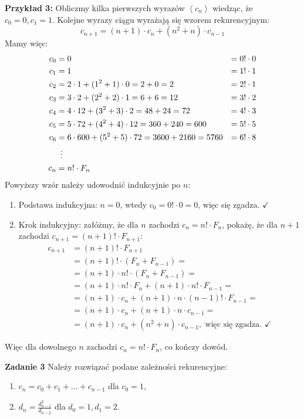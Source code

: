 \documentclass[a4paper,12pt]{article}
\newcommand{\sequence}[1]{\left\langle #1 \right\rangle} %
\begin{document}
\noindent \newline \textbf{Przykład 3:} Obliczmy kilka pierwszych wyrazów $\sequence{c_n}$ wiedząc, że $c_0 = 0, c_1 = 1$. Kolejne wyrazy ciągu wyrażają się wzorem rekurencyjnym: 
\[ c_{n+1} = (n+1) \cdot c_n + (n^2 + n) \cdot c_{n-1} \]
Mamy więc:
\begin{align*}
	c_0 &= 0 													&= 0! \cdot 0 \\
	c_1 &= 1 													&= 1! \cdot 1 \\
	c_2 &= 2\cdot 1 + (1^2 + 1) \cdot 0 = 2 + 0 = 2 			&= 2! \cdot 1 \\
	c_3 &= 3\cdot 2 + (2^2 + 2) \cdot 1 = 6 + 6 = 12 			&= 3! \cdot 2 \\
	c_4 &= 4\cdot 12 + (3^2 + 3) \cdot 2 = 48 + 24 = 72			&= 4! \cdot 3 \\
	c_5 &= 5\cdot 72 + (4^2 + 4) \cdot 12 = 360 + 240 = 600		&= 5! \cdot 5 \\
	c_6 &= 6\cdot 600 + (5^2 + 5) \cdot 72 = 3600 + 2160 = 5760 &= 6! \cdot 8 \\
		&\enskip \vdots \\
	c_n &= n! \cdot F_n
\end{align*}
Powyższy wzór należy udowodnić indukcyjnie po $n$:
\begin{enumerate}
	\item Podstawa indukcyjna: $n = 0$, wtedy $c_0 = 0! \cdot 0 = 0$, więc się zgadza. $\checkmark$
	\item Krok indukcyjny: załóżmy, że dla $n$ zachodzi $c_n = n! \cdot F_n$, pokażę, że dla $n+1$ zachodzi $c_{n+1} = (n+1)! \cdot F_{n+1}$:
	\begin{align*}
		c_{n+1} &= (n + 1)! \cdot F_{n+1} \\
				&= (n + 1)! \cdot (F_n + F_{n-1}) = \\
				&= (n + 1) \cdot n! \cdot (F_n + F_{n-1}) = \\
				&= (n + 1) \cdot n! \cdot F_n + (n + 1) \cdot n! \cdot F_{n-1} = \\
				&= (n + 1) \cdot c_n + (n + 1) \cdot n \cdot (n - 1)! \cdot F_{n-1} = \\
				&= (n + 1) \cdot c_n + (n + 1) \cdot n \cdot c_{n-1} = \\
				&= (n + 1) \cdot c_n + (n^2 + n) \cdot c_{n-1}, \text{ więc się zgadza. } \checkmark
	\end{align*}
\end{enumerate}
Więc dla dowolnego $n$ zachodzi $c_n = n! \cdot F_n$, co kończy dowód.

\noindent \newline \textbf{Zadanie 3} \newline
Należy rozwiązać podane zależności rekurencyjne:
\begin{enumerate}
	\item $c_n = c_0 + c_1 + \ldots + c_{n-1}$ dla $c_0 = 1$,
	\item $d_n = \frac{d_{n-1}^2}{d_{n-2}}$ dla $d_0 = 1, d_1 = 2$.
\end{enumerate}
\end{document}
